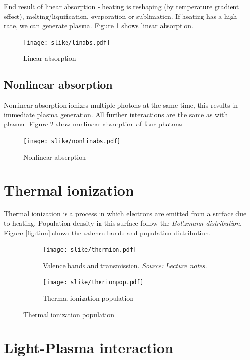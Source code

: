 End result of linear absorption - heating is reshaping (by temperature gradient effect), melting/liquification, evaporation or sublimation.
If heating has a high rate, we can generate plasma. Figure \ref{fig:linabsor} shows linear absorption.
\begin{figure}[h!]
    \centering
    \texttt{[image: slike/linabs.pdf]}
    \caption{Linear absorption}
    \label{fig:linabsor}
\end{figure} 


\subsection{Nonlinear absorption}

Nonlinear absorption ionizes multiple photons at the same time, this results in immediate plasma generation.
All further interactions are the same as with plasma. 
Figure \ref{fig:nonlinabs} show nonlinear absorption of four photons.
\begin{figure}[h!]
    \centering
    \texttt{[image: slike/nonlinabs.pdf]}
    \caption{Nonlinear absorption}
    \label{fig:nonlinabs}
\end{figure}

\section{Thermal ionization}
Thermal ionization is a process in which electrons are emitted from a surface due to heating. 
Population density in this surface follow the \textit{Boltzmann distribution}. Figure \ref{fig:tion} shows the
valence bands and population distribution. 

\begin{figure}[h!]
    \centering
    \begin{subfigure}{0.35\textwidth}
        \texttt{[image: slike/thermion.pdf]}
        \caption{Valence bands and transmission. \textit{Source: Lecture notes.}}
    \end{subfigure}
    \begin{subfigure}{0.35\textwidth}
        \texttt{[image: slike/therionpop.pdf]}
        \caption{Thermal ionization population}
    \end{subfigure}
\end{figure}

\section{Light-Plasma interaction}

